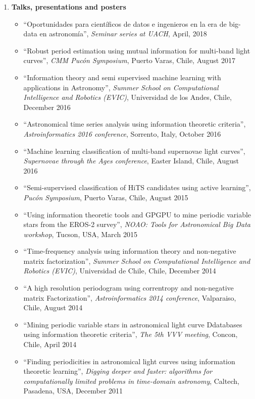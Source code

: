 \documentclass[letterpaper,11pt]{article}
\newcommand{\compactlist}{\setlength{\parskip}{0pt} \setlength{\leftskip}{2em}}
\begin{document}
\begin{enumerate}[I]
    \item \textbf{Talks, presentations and posters}
        \begin{itemize}  \compactlist{}
        \item ``Oportunidades para científicos de datos e ingenieros en la era de big-data en astronomía'', \emph{Seminar series at UACH}, April, 2018
        \item ``Robust period estimation using mutual information for multi-band light curves'', \emph{CMM Pucón Symposium}, Puerto Varas, Chile, August 2017
        \item ``Information theory and semi supervised machine learning with applications in Astronomy'', \emph{Summer School on Computational Intelligence and Robotics (EVIC)}, Universidad de los Andes, Chile, December 2016
        \item ``Astronomical time series analysis using information theoretic criteria'', \emph{Astroinformatics 2016 conference}, Sorrento, Italy, October 2016
        \item ``Machine learning classification of multi-band supernovae light curves'', \emph{Supernovae through the Ages conference}, Easter Island, Chile, August 2016
        \item ``Semi-supervised classification of HiTS candidates using active learning'', \emph{Pucón Symposium}, Puerto Varas, Chile, August 2015
        \item ``Using information theoretic tools and GPGPU to mine periodic variable stars from the EROS-2 survey'', \emph{NOAO: Tools for Astronomical Big Data workshop}, Tucson, USA, March 2015
        \item ``Time-frequency analysis using information theory and non-negative matrix factorization'', \emph{Summer School on Computational Intelligence and Robotics (EVIC)}, Universidad de Chile, Chile, December 2014
        \item ``A high resolution periodogram using correntropy and non-negative matrix Factorization'', \emph{Astroinformatics 2014 conference}, Valparaiso, Chile, August 2014
        \item ``Mining periodic variable stars in astronomical light curve Ddatabases using information theoretic criteria'', \emph{The 5th VVV meeting}, Concon, Chile, April 2014
        \item ``Finding periodicities in astronomical light curves using information theoretic learning'', \emph{Digging deeper and faster: algorithms for computationally limited problems in time-domain astronomy}, Caltech, Pasadena, USA, December 2011
        \end{itemize}
        

\end{enumerate}
\end{document}
